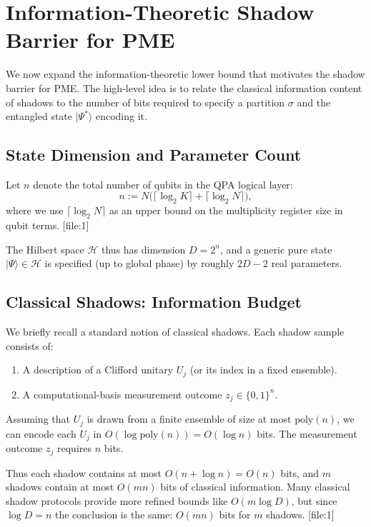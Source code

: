 \documentclass[11pt]{article}
\begin{document}
\section{Information-Theoretic Shadow Barrier for PME}
\label{app:shadow-barrier}

We now expand the information-theoretic lower bound that motivates the shadow barrier for PME. The high-level idea is to relate the classical information content of shadows to the number of bits required to specify a partition $\sigma$ and the entangled state $|\Psi^*\rangle$ encoding it.

\subsection{State Dimension and Parameter Count}

Let $n$ denote the total number of qubits in the QPA logical layer:
\[
  n := N\bigl(\lceil\log_2 K\rceil + \lceil\log_2 N\rceil\bigr),
\]
where we use $\lceil\log_2 N\rceil$ as an upper bound on the multiplicity register size in qubit terms. [file:1]

The Hilbert space $\mathcal{H}$ thus has dimension $D = 2^n$, and a generic pure state $|\Psi\rangle \in \mathcal{H}$ is specified (up to global phase) by roughly $2D-2$ real parameters.

\subsection{Classical Shadows: Information Budget}

We briefly recall a standard notion of classical shadows. Each shadow sample consists of:
\begin{enumerate}
  \item A description of a Clifford unitary $U_j$ (or its index in a fixed ensemble).
  \item A computational-basis measurement outcome $z_j \in \{0,1\}^n$.
\end{enumerate}

Assuming that $U_j$ is drawn from a finite ensemble of size at most $\mathrm{poly}(n)$, we can encode each $U_j$ in $O(\log \mathrm{poly}(n)) = O(\log n)$ bits. The measurement outcome $z_j$ requires $n$ bits.

Thus each shadow contains at most $O(n + \log n) = O(n)$ bits, and $m$ shadows contain at most $O(mn)$ bits of classical information. Many classical shadow protocols provide more refined bounds like $O(m\log D)$, but since $\log D = n$ the conclusion is the same: $O(mn)$ bits for $m$ shadows. [file:1]
\end{document}
